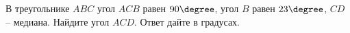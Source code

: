 \begin{ex}
	\begin{condition}
		В треугольнике \( ABC \) угол \( ACB \) равен \( 90\degree \), угол \( B \) равен \( 23\degree \), \( CD \) – медиана. Найдите угол \( ACD \). Ответ дайте в градусах.
	\end{condition}
\end{ex}
